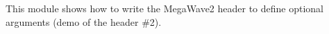 This module shows how to write the MegaWave2 header to define optional
arguments (demo of the header \#2).
